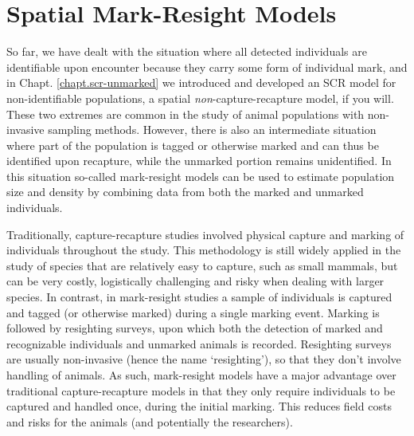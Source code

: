 \chapter{
Spatial Mark-Resight Models
}

\label{chapt.partialID}

\vspace{.3in}


So far, %
we have dealt with the situation where all detected
individuals are
identifiable
upon encounter because they carry some form of individual mark,
and in Chapt. \ref{chapt.scr-unmarked} %
we introduced and developed an SCR model for
non-identifiable %
populations, a spatial {\it non}-capture-recapture
model, if you will.
These
two extremes are common in the study of animal populations with
non-invasive sampling methods. However, there is also an intermediate
situation where
part of the population is tagged or otherwise
marked and can thus be identified upon recapture, while the unmarked
portion remains unidentified. In this situation so-called mark-resight
models \citep{bartmann_etal:1987, arnason_etal:1991, neal_etal:1993}
can be used to estimate population size and density
by %
combining data
from both the marked and unmarked individuals.

Traditionally,
capture-recapture studies involved physical capture and marking of
individuals throughout the study. %
This methodology is still widely applied in the
study of species that are relatively easy to capture, such as small
mammals, but can be very costly, logistically challenging and risky
when dealing with larger species. In contrast, in mark-resight studies
a sample of individuals is captured and tagged (or otherwise marked)
during a single marking event. Marking is followed by resighting
surveys, upon which both the detection of marked and recognizable
individuals and unmarked animals is recorded. Resighting surveys are
usually non-invasive (hence the name `resighting'), so that they
don't involve handling of animals. As such, mark-resight models have a
major advantage over traditional capture-recapture models in that they
only require individuals to be captured and handled once, during the
initial marking. This reduces field costs and risks for the animals
(and potentially the researchers).

